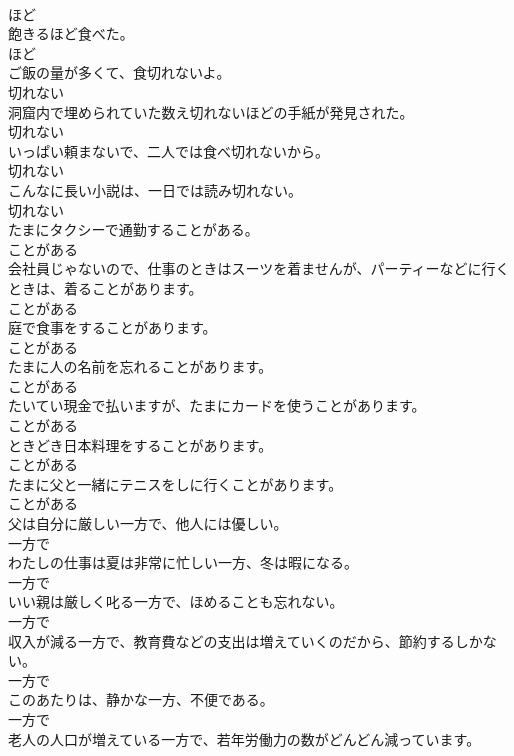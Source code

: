 \documentclass[8pt]{extreport}
\begin{document}
\begin{CJK}{UTF8}{min}
\\	ほど	
\\	飽きるほど食べた。	
\\	ほど	
\\	ご飯の量が多くて、食切れないよ。	
\\	切れない	
\\	洞窟内で埋められていた数え切れないほどの手紙が発見された。	
\\	切れない	
\\	いっぱい頼まないで、二人では食べ切れないから。	
\\	切れない	
\\	こんなに長い小説は、一日では読み切れない。	
\\	切れない	
\\	たまにタクシーで通勤することがある。	
\\	ことがある	
\\	会社員じゃないので、仕事のときはスーツを着ませんが、パーティーなどに行くときは、着ることがあります。	
\\	ことがある	
\\	庭で食事をすることがあります。	
\\	ことがある	
\\	たまに人の名前を忘れることがあります。	
\\	ことがある	
\\	たいてい現金で払いますが、たまにカードを使うことがあります。	
\\	ことがある	
\\	ときどき日本料理をすることがあります。	
\\	ことがある	
\\	たまに父と一緒にテニスをしに行くことがあります。	
\\	ことがある	
\\	父は自分に厳しい一方で、他人には優しい。	
\\	一方で	
\\	わたしの仕事は夏は非常に忙しい一方、冬は暇になる。	
\\	一方で	
\\	いい親は厳しく叱る一方で、ほめることも忘れない。	
\\	一方で	
\\	収入が減る一方で、教育費などの支出は増えていくのだから、節約するしかない。	
\\	一方で	
\\	このあたりは、静かな一方、不便である。	
\\	一方で	
\\	老人の人口が増えている一方で、若年労働力の数がどんどん減っています。	

\end{CJK}
\end{document}
